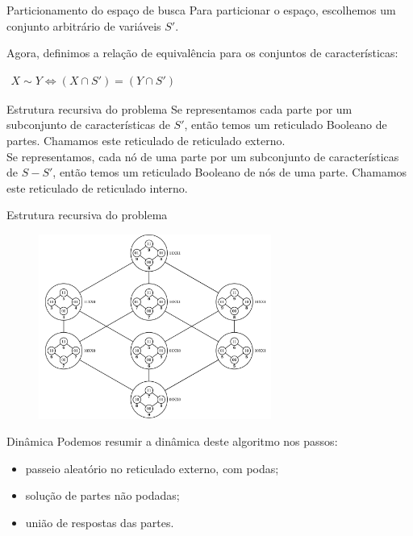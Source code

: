 \documentclass{beamer}
\begin{document}
\begin{frame}{Particionamento do espaço de busca}
Para particionar o espaço, escolhemos um conjunto arbitrário de 
variáveis $S'$. \pause

Agora, definimos a relação de equivalência para os conjuntos de 
características: \\
\begin{center}
$
\begin{aligned}
    X \sim Y \iff (X \cap S') = (Y \cap S')
\end{aligned}
$
\end{center}
\end{frame}

\begin{frame}{Estrutura recursiva do problema}
    Se representamos cada parte por um subconjunto de características de
    $S'$, então temos um reticulado Booleano de partes. Chamamos este
    reticulado de \alert{reticulado externo}.
    \vspace{1em}\\
    \pause
    Se representamos, cada nó de uma parte por um subconjunto de 
    características de $S - S'$, então temos um reticulado Booleano
    de nós de uma parte. Chamamos este reticulado de \alert{reticulado
    interno}.
\end{frame}

\begin{frame}{Estrutura recursiva do problema}
    \begin{figure}
    \includegraphics[clip=true, width=0.68\textwidth]{pucs/sample_run/A.pdf}
    \end{figure}
\end{frame}

\begin{frame}{Dinâmica}
    Podemos resumir a dinâmica deste algoritmo nos passos:
    \begin{itemize}
    \item{passeio aleatório no reticulado externo, com podas;}
    \item{solução de partes não podadas;}
    \item{união de respostas das partes.}
    \end{itemize}
\end{frame}
\end{document}
